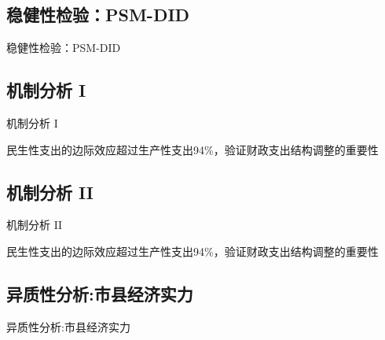 \documentclass{beamer}
\begin{document}
\subsection{稳健性检验：PSM-DID}\label{ux7a33ux5065ux6027ux68c0ux9a8cpsm-did}

\begin{frame}{稳健性检验：PSM-DID}
\begin{adjustbox}{max totalheight=0.7\textheight} 

\end{adjustbox}

\vspace{-2mm}
\end{frame}

\subsection{机制分析 I}\label{ux673aux5236ux5206ux6790-i}

\begin{frame}{机制分析 I}
\begin{adjustbox}{max width=0.95\textwidth,center}

\end{adjustbox}

\scriptsize

民生性支出的边际效应超过生产性支出94\%，验证财政支出结构调整的重要性
\end{frame}

\subsection{机制分析 II}\label{ux673aux5236ux5206ux6790-ii}

\begin{frame}{机制分析 II}
\begin{adjustbox}{max width=0.95\textwidth,center}

\end{adjustbox}

\scriptsize

民生性支出的边际效应超过生产性支出94\%，验证财政支出结构调整的重要性
\end{frame}

\subsection{异质性分析:市县经济实力}\label{ux5f02ux8d28ux6027ux5206ux6790ux5e02ux53bfux7ecfux6d4eux5b9eux529b}

\begin{frame}{异质性分析:市县经济实力}
\begin{adjustbox}{max width=0.95\textwidth,center}

\end{adjustbox}
\end{frame}
\end{document}
